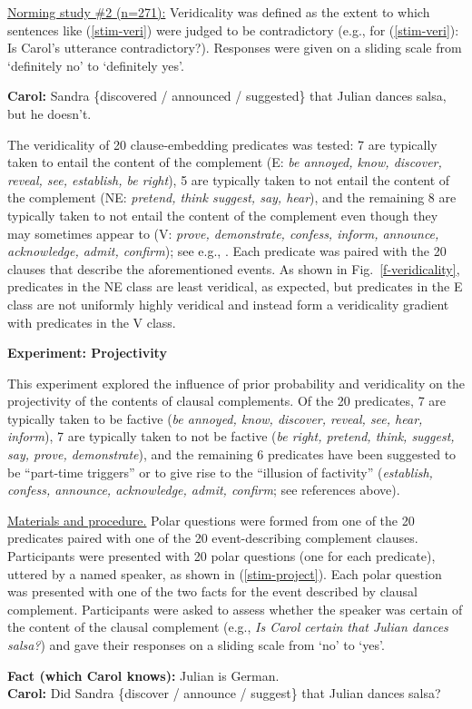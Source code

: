 \documentclass[12pt,fleqn]{article}
\newcommand{\6}{\mbox{$[\hspace*{-.6mm}[$}}
\newcommand{\9}{\mbox{$]\hspace*{-.6mm}]$}}
\begin{document}
\underline{Norming study \#2 (n=271):} Veridicality was defined as the extent to which sentences like (\ref{stim-veri}) were judged to be contradictory (e.g., for (\ref{stim-veri}): Is Carol's utterance contradictory?). Responses were given on a sliding scale from `definitely no' to `definitely yes'. 
\vspace*{-.2cm}
\begin{exe}
\ex\label{stim-veri} {\bf Carol:} Sandra \{discovered / announced / suggested\} that Julian dances salsa, but he doesn't. 
\end{exe}
\vspace*{-.2cm}
The veridicality of 20 clause-embedding predicates was tested: 7 are typically taken to entail the content of the complement (E: {\em be annoyed, know, discover, reveal, see, establish, be right}), 5 are typically taken to not entail the content of the complement (NE: {\em pretend, think suggest, say, hear}), and the remaining 8 are typically taken to not entail the content of the complement even though they may sometimes appear to (V: {\em prove, demonstrate, confess, inform, announce, acknowledge, admit, confirm}); see e.g., \citealt{schlenker10,swanson2012,anand-hacquard2014}. Each predicate was paired with the 20 clauses that describe the aforementioned events. As shown in Fig.~\ref{f-veridicality}, predicates in the NE class are least veridical, as expected, but predicates in the E class are not uniformly highly veridical and instead form a veridicality gradient with predicates in the V class.

{\bf Experiment: Projectivity}

This experiment explored the influence of prior probability and veridicality on the projectivity of the contents of clausal complements. Of the 20 predicates, 7 are typically taken to be factive ({\em be annoyed, know, discover, reveal, see, hear, inform}), 7 are typically taken to not be factive ({\em be right, pretend, think, suggest, say, prove, demonstrate}), and the remaining 6 predicates have been suggested to be ``part-time triggers'' or to give rise to the ``illusion of factivity'' ({\em establish,  confess, announce, acknowledge, admit, confirm}; see references above).

\underline{Materials and procedure.} Polar questions were formed from one of the 20 predicates paired with one of the 20 event-describing complement clauses. Participants were presented with 20 polar questions (one for each predicate), uttered by a named speaker, as shown in (\ref{stim-project}). Each polar question was presented with one of the two facts for the event described by clausal complement. Participants were asked to assess whether the speaker was certain of the content of the clausal complement (e.g., \emph{Is Carol certain that Julian dances salsa?}) and gave their responses on a sliding scale from `no' to `yes'. 
\vspace*{-.2cm}
\begin{exe}
\ex\label{stim-project} {\bf Fact (which Carol knows):} Julian is German.  \\ 
{\bf Carol:} Did Sandra \{discover / announce / suggest\} that Julian dances salsa?
\end{exe}
\vspace*{-.2cm}
\end{document}
